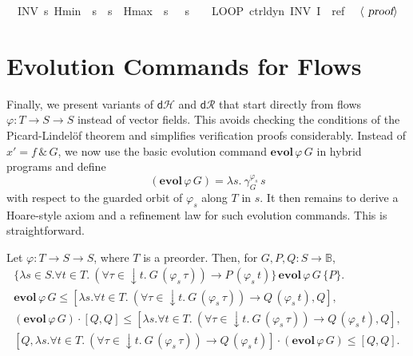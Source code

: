 \documentclass[envcountsame]{llncs}
\newcommand{\dH}{\mathsf{d}\mathcal{H}}
\newcommand{\dR}{\mathsf{d}\mathcal{R}}
\newcommand{\flow}{\varphi}
\newcommand{\bools}{\mathbb{B}}
\newcommand\notein[3]{\todo[inline,linecolor=orange!80!black,backgroundcolor=#2!20]{#1: #3}%
}
\newcommand{\gin}[1]{\notein{{\bf GS}}{gcolor}{#1}}
\begin{document}
\begin{example}
\begin{isabellebody}
\ \ INV\ {\isacharparenleft}{\isasymlambda}s{\isachardot}\ Hmin\ {\isasymle}\ s{\isachardollar}{}\ {\isasymand}\ s{\isachardollar}{}\ {\isasymle}\ Hmax\ {\isasymand}\ {\isacharparenleft}s{\isachardollar}{}\ {\isacharequal}{}\ {\isasymor}\ s{\isachardollar}{}\ {\isacharequal}\ {}{\isacharparenright}{\isacharparenright}{\isacharparenright}{\isachardoublequoteclose}\ {\isacharparenleft}\ {\isachardoublequoteopen}LOOP\ {\isacharparenleft}{\isacharquery}ctrl{\isacharsemicolon}{\isacharquery}dyn{\isacharparenright}\ INV\ {\isacharquery}I\ {\isasymle}\ {\isacharquery}ref{\isachardoublequoteclose}{\isacharparenright}\isanewline
\ \ $\langle \isa{proof}\rangle$\isanewline
\end{isabellebody}
\end{example}


\section{Evolution Commands for Flows}\label{sec:from-flows}

Finally, we present variants of $\dH$ and $\dR$ that start directly
from flows $\flow:T\to S\to S$ instead of vector fields.  This avoids
checking the conditions of the Picard-Lindel\"of theorem and
simplifies verification proofs considerably.  Instead of
$x'=f\, \&\, G$, we now use the basic evolution command
$\mathbf{evol}\, \flow\, G$ in hybrid programs and define
\begin{equation*}
  (\mathbf{evol}\, \flow\, G) = \lambda s.\ \gamma^{\flow_s}_G\, s
\end{equation*}
with respect to the guarded orbit of $\flow_s$ along $T$ in $s$. It
then remains to derive a Hoare-style axiom and a refinement law
for such evolution commands. This is straightforward.
\begin{lemma}\label{P:hr-evlfl}
Let $\flow:T\to S\to S$, \gin{what is $S$?} where $T$ is a preorder. Then, for $G,P,Q:S\to \bools$,
\begin{gather*}
\{\lambda s\in S.\forall t\in T.\ (\forall
\tau\in {\downarrow}t.\ G\, (\flow_s\, \tau)) \rightarrow P\,
(\flow_s\, t)\}\, \mathbf{evol}\, \flow\, G\, \{P\}. \label{eq:h-evlfl}\tag{h-evlfl}\\
\mathbf{evol}\, \flow\, G \le [\lambda s.\forall t\in T.\ (\forall
\tau\in {\downarrow}t.\ G\, (\flow_s\, \tau))\to Q\, (\flow_s\, t),Q],\label{eq:r-evlf}\tag{r-evlf}\\
(\mathbf{evol}\, \flow\, G) \cdot \left[Q,Q\right] \le [\lambda s. \forall t\in T.\ (\forall
\tau\in {\downarrow}t.\ G\, (\flow_s\, \tau))\to Q\, (\flow_s\, t),Q],\label{eq:r-evlfl}\tag{r-evlfl}\\
\left[Q,\lambda s. \forall t\in T.\ (\forall
\tau\in {\downarrow}t.\ G\, (\flow_s\, \tau))\to Q\, (\flow_s\, t)\right]\cdot (\mathbf{evol}\, \flow\, G) \le [Q,Q].\label{eq:r-evlfr}\tag{r-evlfr}\\
\end{gather*}
\end{lemma}
\end{document}
